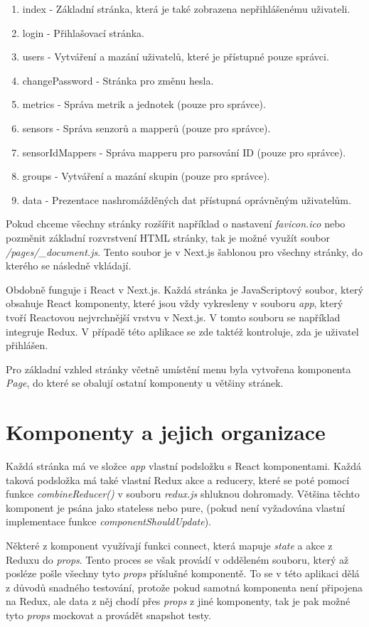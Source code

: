 \documentclass[thesis=M,czech]{FITthesis}[2018/10/20]
\begin{document}
\begin{enumerate}
\item index - Základní stránka, která je také zobrazena nepřihlášenému uživateli.
\item login - Přihlašovací stránka.
\item users - Vytváření a mazání uživatelů, které je přístupné pouze správci.
\item changePassword - Stránka pro změnu hesla.
\item metrics - Správa metrik a jednotek (pouze pro správce).
\item sensors - Správa senzorů a mapperů (pouze pro správce).
\item sensorIdMappers - Správa mapperu pro parsování ID (pouze pro správce).
\item groups - Vytváření a mazání skupin (pouze pro správce).
\item data - Prezentace nashromážděných dat přístupná oprávněným uživatelům.

\end{enumerate}
Pokud chceme všechny stránky rozšířit například o nastavení \textit{favicon.ico} nebo pozměnit základní rozvrstvení HTML stránky, tak je možné využít soubor \textit{/pages/\_document.js}. Tento soubor je v Next.js šablonou pro všechny stránky, do kterého se následně vkládají.

Obdobně funguje i React v Next.js. Každá stránka je JavaScriptový soubor, který obsahuje React komponenty, které jsou vždy vykresleny v souboru \textit{app}, který tvoří Reactovou nejvrchnější vrstvu v Next.js. V tomto souboru se například integruje Redux. V případě této aplikace se zde taktéž kontroluje, zda je uživatel přihlášen.

Pro základní vzhled stránky včetně umístění menu byla vytvořena komponenta \textit{Page}, do které se obalují ostatní komponenty u většiny stránek.
\newpage
\section{Komponenty a jejich organizace}
	Každá stránka má ve složce \textit{app} vlastní podsložku s React komponentami. Každá taková podsložka má také vlastní Redux akce a reducery, které se poté pomocí funkce \textit{combineReducer()} v souboru \textit{redux.js} shluknou dohromady. Většina těchto komponent je psána jako stateless nebo pure, (pokud není vyžadována vlastní implementace funkce \textit{componentShouldUpdate}).
	
	Některé z komponent využívají funkci connect, která mapuje \textit{state} a akce z Reduxu do \textit{props}. Tento proces se však provádí v odděleném souboru, který až posléze pošle všechny tyto \textit{props} příslušné komponentě. To se v této aplikaci dělá z důvodů snadného testování, protože pokud samotná komponenta není připojena na Redux, ale data z něj chodí přes \textit{props} z jiné komponenty, tak je pak možné tyto \textit{props} mockovat a provádět snapshot testy. 
	
\end{document}

